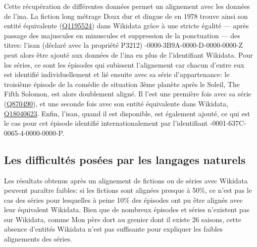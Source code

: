 Cette récupération de différentes données permet un alignement avec les données de l'\ac{ina}. La fiction long métrage \og Doux dur et dingue\fg{} de  en 1978 trouve ainsi son entité équivalente (\href{https://www.wikidata.org/wiki/Q1195524}{Q1195524}) dans Wikidata grâce à une stricte égalité --- après passage des majuscules en minuscules et suppression de la ponctuation --- des titres: l'\ac{isan} (déclaré avec la propriété P3212) -0000-3B9A-0000-D-0000-0000-Z\fg{} peut alors être ajouté aux données de l'\ac{ina} en plus de l'identifiant Wikidata.
Pour les séries, ce sont les épisodes qui subissent l'alignement car chacun d'entre eux est identifié individuellement et lié ensuite avec sa série d'appartenance: le troisième épisode de la comédie de situation \og 3ème planète après le Soleil\fg{}, \og The Fifth Solomon\fg{}, est alors doublement aligné. Il l'est une première fois avec sa série (\href{https://www.wikidata.org/wiki/Q870490}{Q870490}), et une seconde fois avec son entité équivalente dans Wikidata, \href{https://www.wikidata.org/wiki/Q18040623}{Q18040623}. Enfin, l'\ac{isan}, quand il est disponible, est également ajouté, ce qui est le cas pour cet épisode identifié internationalement par l'identifiant -0001-637C-0065-4-0000-0000-P\fg{}.

\subsection{\label{III-A-3-c}Les difficultés posées par les langages naturels}

Les résultats obtenus après un alignement de fictions ou de séries avec Wikidata peuvent paraître faibles: si les fictions sont alignées presque à 50\%, ce n'est pas le cas des séries pour lesquelles à peine 10\% des épisodes ont pu être alignés avec leur équivalent Wikidata. Bien que de nombreux épisodes et séries n'existent pas sur Wikidata, comme \og Mon père dort au grenier\fg{} dont il existe 26 saisons, cette absence d'entités Wikidata n'est pas suffisante pour expliquer les faibles alignements des séries.\\

